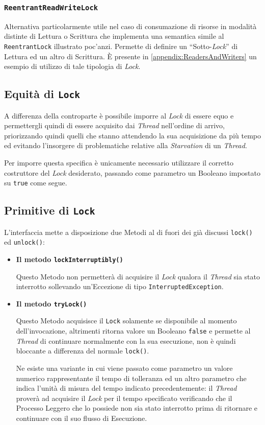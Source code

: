 \subsubsection{\texttt{ReentrantReadWriteLock}}
Alternativa particolarmente utile nel caso di consumazione di risorse in modalità distinte di Lettura o Scrittura che implementa una semantica simile al \texttt{ReentrantLock} illustrato poc'anzi. Permette di definire un ``Sotto-\textit{Lock}'' di Lettura ed un altro di Scrittura\cite{ReentrantRWLock_JavaDocs}. È presente in \autoref{appendix:ReadersAndWriters} un esempio di utilizzo di tale tipologia di \textit{Lock}.
\subsection{Equità di \texttt{Lock}}
A differenza della controparte è possibile imporre al \textit{Lock} di essere equo e permettergli quindi di essere acquisito dai \textit{Thread} nell'ordine di arrivo, priorizzando quindi quelli che stanno attendendo la sua acquisizione da più tempo ed evitando l'insorgere di problematiche relative alla \textit{Starvation} di un \textit{Thread}. \par
Per imporre questa specifica è unicamente necessario utilizzare il corretto costruttore del \textit{Lock} desiderato, passando come parametro un Booleano impostato su \texttt{true} come segue.

\subsection{Primitive di \texttt{Lock}}
L'interfaccia mette a disposizione due Metodi al di fuori dei già discussi \texttt{lock()} ed \texttt{unlock()}:
\begin{itemize}
    \item \textbf{Il metodo \texttt{lockInterruptibly()}} \par
    Questo Metodo non permetterà di acquisire il \textit{Lock} qualora il \textit{Thread} sia stato interrotto sollevando un'Eccezione di tipo \texttt{InterruptedException}.
    \item \textbf{Il metodo \texttt{tryLock()}} \par
    Questo Metodo acquisisce il \texttt{Lock} solamente se disponibile al momento dell'invocazione, altrimenti ritorna valore un Booleano \texttt{false} e permette al \textit{Thread} di continuare normalmente con la sua esecuzione, non è quindi bloccante a differenza del normale \texttt{lock()}. \par
    Ne esiste una variante in cui viene passato come parametro un valore numerico rappresentante il tempo di tolleranza ed un altro parametro che indica l'unità di misura del tempo indicato precedentemente: il \textit{Thread} proverà ad acquisire il \textit{Lock} per il tempo specificato verificando che il Processo Leggero che lo possiede non sia stato interrotto prima di ritornare e continuare con il suo flusso di Esecuzione.
\end{itemize}
